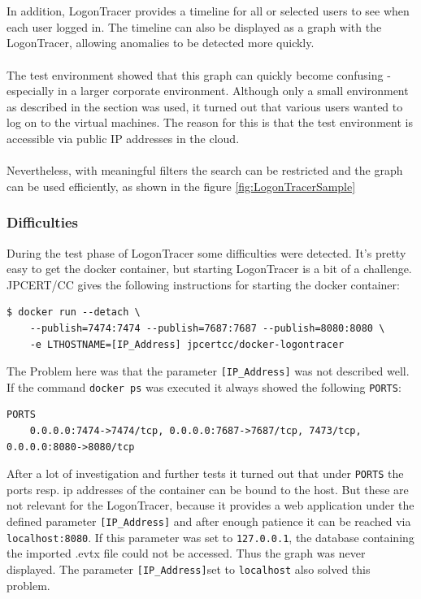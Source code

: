 \\\\
In addition, LogonTracer provides a timeline for all or selected users to see when each user logged in. The timeline can also be displayed as a graph with the LogonTracer, allowing anomalies to be detected more quickly.
\\\\
The test environment showed that this graph can quickly become confusing - especially in a larger corporate environment. Although only a small environment as described in the section was used, it turned out that various users wanted to log on to the virtual machines. The reason for this is that the test environment is accessible via public IP addresses in the cloud.
\\\\
Nevertheless, with meaningful filters the search can be restricted and the graph can be used efficiently, as shown in the figure \ref{fig:LogonTracerSample} 
\subsubsection{Difficulties}
During the test phase of LogonTracer some difficulties were detected. It's pretty easy to get the docker container, but starting LogonTracer is a bit of a challenge. JPCERT/CC gives the following instructions for starting the docker container:
\begin{lstlisting}[language=HTML,caption=LogonTracer: given docker run command]
    $ docker run --detach \
    --publish=7474:7474 --publish=7687:7687 --publish=8080:8080 \
    -e LTHOSTNAME=[IP_Address] jpcertcc/docker-logontracer
\end{lstlisting}
The Problem here was that the parameter \lstinline|[IP_Address]| was not described well. If the command \lstinline|docker ps| was executed it always showed the following \lstinline|PORTS|:
\begin{lstlisting}[caption=LogonTraceer: docker ps (PORTS)]
    PORTS
    0.0.0.0:7474->7474/tcp, 0.0.0.0:7687->7687/tcp, 7473/tcp, 0.0.0.0:8080->8080/tcp
\end{lstlisting}
After a lot of investigation and further tests it turned out that under \lstinline|PORTS| the ports resp. ip addresses of the container can be bound to the host. But these are not relevant for the LogonTracer, because it provides a web application under the defined parameter \lstinline|[IP_Address]| and after enough patience it can be reached via \lstinline|localhost:8080|. If this parameter was set to \lstinline|127.0.0.1|, the database containing the imported .evtx file could not be accessed. Thus the graph was never displayed. The parameter \lstinline|[IP_Address]|set to \lstinline|localhost| also solved this problem.

